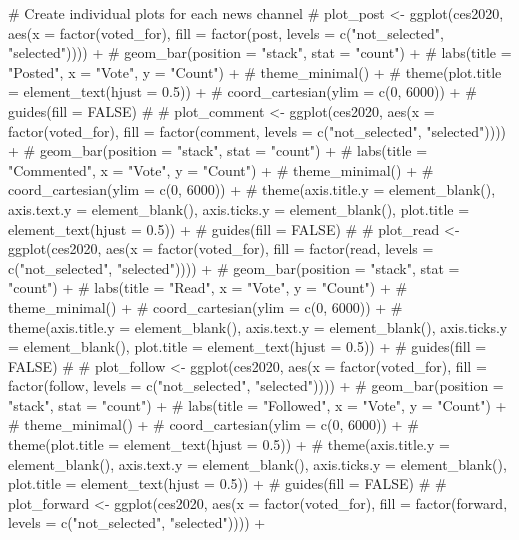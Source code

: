 \documentclass[
  letterpaper,
  DIV=11,
  numbers=noendperiod]{scrartcl}
\newenvironment{Shaded}{\begin{snugshade}}{\end{snugshade}}
\newcommand{\CommentTok}[1]{\textcolor[rgb]{0.37,0.37,0.37}{#1}}
\begin{document}
\begin{Shaded}
\begin{Highlighting}[]
\CommentTok{\# Create individual plots for each news channel}
\CommentTok{\# plot\_post \textless{}{-} ggplot(ces2020, aes(x = factor(voted\_for), fill = factor(post, levels = c("not\_selected", "selected")))) +}
\CommentTok{\#   geom\_bar(position = "stack", stat = "count") +}
\CommentTok{\#   labs(title = "Posted", x = "Vote", y = "Count") +}
\CommentTok{\#   theme\_minimal() +}
\CommentTok{\#   theme(plot.title = element\_text(hjust = 0.5)) +}
\CommentTok{\#   coord\_cartesian(ylim = c(0, 6000)) +  }
\CommentTok{\#   guides(fill = FALSE)}
\CommentTok{\# }
\CommentTok{\# plot\_comment \textless{}{-} ggplot(ces2020, aes(x = factor(voted\_for), fill = factor(comment, levels = c("not\_selected", "selected")))) +}
\CommentTok{\#   geom\_bar(position = "stack", stat = "count") +}
\CommentTok{\#   labs(title = "Commented", x = "Vote", y = "Count") +}
\CommentTok{\#   theme\_minimal() +}
\CommentTok{\#   coord\_cartesian(ylim = c(0, 6000)) +  }
\CommentTok{\#   theme(axis.title.y = element\_blank(), axis.text.y = element\_blank(), axis.ticks.y = element\_blank(), plot.title = element\_text(hjust = 0.5)) +}
\CommentTok{\#   guides(fill = FALSE)}
\CommentTok{\# }
\CommentTok{\# plot\_read \textless{}{-} ggplot(ces2020, aes(x = factor(voted\_for), fill = factor(read, levels = c("not\_selected", "selected")))) +}
\CommentTok{\#   geom\_bar(position = "stack", stat = "count") +}
\CommentTok{\#   labs(title = "Read", x = "Vote", y = "Count") +}
\CommentTok{\#   theme\_minimal() +}
\CommentTok{\#   coord\_cartesian(ylim = c(0, 6000)) +}
\CommentTok{\#   theme(axis.title.y = element\_blank(), axis.text.y = element\_blank(), axis.ticks.y = element\_blank(), plot.title = element\_text(hjust = 0.5)) +}
\CommentTok{\#   guides(fill = FALSE)}
\CommentTok{\# }
\CommentTok{\# plot\_follow \textless{}{-} ggplot(ces2020, aes(x = factor(voted\_for), fill = factor(follow, levels = c("not\_selected", "selected")))) +}
\CommentTok{\#   geom\_bar(position = "stack", stat = "count") +}
\CommentTok{\#   labs(title = "Followed", x = "Vote", y = "Count") +}
\CommentTok{\#   theme\_minimal() +}
\CommentTok{\#   coord\_cartesian(ylim = c(0, 6000)) +}
\CommentTok{\#   theme(plot.title = element\_text(hjust = 0.5)) +}
\CommentTok{\#   theme(axis.title.y = element\_blank(), axis.text.y = element\_blank(), axis.ticks.y = element\_blank(), plot.title = element\_text(hjust = 0.5)) +}
\CommentTok{\#   guides(fill = FALSE)}
\CommentTok{\# }
\CommentTok{\# plot\_forward \textless{}{-} ggplot(ces2020, aes(x = factor(voted\_for), fill = factor(forward, levels = c("not\_selected", "selected")))) +}

\end{Highlighting}
\end{Shaded}
\end{document}
